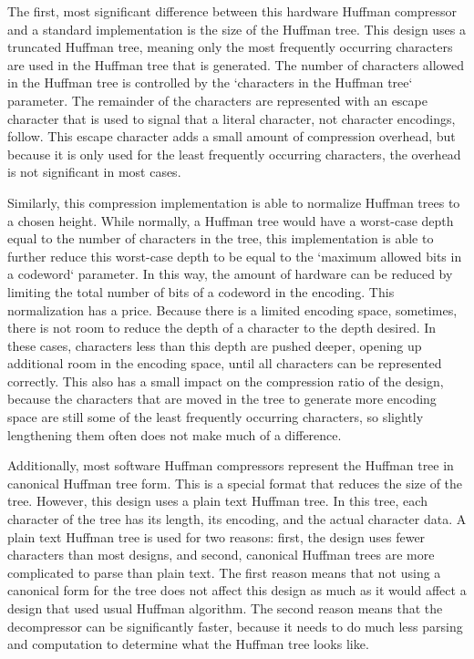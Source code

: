 \documentclass[doublespace,nopageskip]{VTthesis}
\begin{document}
The first, most significant difference between this hardware Huffman compressor and a standard implementation is the size of the Huffman tree. This design uses a truncated Huffman tree, meaning only the most frequently occurring characters are used in the Huffman tree that is generated. The number of characters allowed in the Huffman tree is controlled by the `characters in the Huffman tree` parameter. The remainder of the characters are represented with an escape character that is used to signal that a literal character, not character encodings, follow. This escape character adds a small amount of compression overhead, but because it is only used for the least frequently occurring characters, the overhead is not significant in most cases.

Similarly, this compression implementation is able to normalize Huffman trees to a chosen height. While normally, a Huffman tree would have a worst-case depth equal to the number of characters in the tree, this implementation is able to further reduce this worst-case depth to be equal to the `maximum allowed bits in a codeword` parameter. In this way, the amount of hardware can be reduced by limiting the total number of bits of a codeword in the encoding. This normalization has a price. Because there is a limited encoding space, sometimes, there is not room to reduce the depth of a character to the depth desired. In these cases, characters less than this depth are pushed deeper, opening up additional room in the encoding space, until all characters can be represented correctly. This also has a small impact on the compression ratio of the design, because the characters that are moved in the tree to generate more encoding space are still some of the least frequently occurring characters, so slightly lengthening them often does not make much of a difference.

Additionally, most software Huffman compressors represent the Huffman tree in canonical Huffman tree form. This is a special format that reduces the size of the tree. However, this design uses a plain text Huffman tree. In this tree, each character of the tree has its length, its encoding, and the actual character data. A plain text Huffman tree is used for two reasons: first, the design uses fewer characters than most designs, and second, canonical Huffman trees are more complicated to parse than plain text. The first reason means that not using a canonical form for the tree does not affect this design as much as it would affect a design that used usual Huffman algorithm. The second reason means that the decompressor can be significantly faster, because it needs to do much less parsing and computation to determine what the Huffman tree looks like. 
\end{document}
